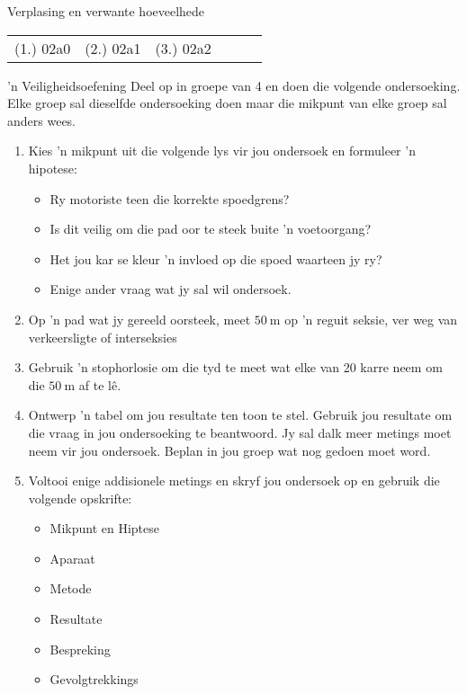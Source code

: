 \begin{exercises}{Verplasing en verwante hoeveelhede}
\practiceinfo
 \par \begin{tabular}[h]{cccccc}
 (1.) 02a0  &  (2.) 02a1  &  (3.) 02a2  & \end{tabular}
\end{exercises} \pagebreak


\begin{Investigation}{ 'n Veiligheidsoefening}
            \nopagebreak
Deel op in groepe van 4 en doen die volgende ondersoeking. Elke groep sal dieselfde ondersoeking doen maar die mikpunt van elke groep sal anders wees.\par

\begin{enumerate}[noitemsep, label=\textbf{\arabic*}. ] 
    \item Kies 'n mikpunt uit die volgende lys vir jou ondersoek en formuleer 'n hipotese:
    \begin{itemize}[noitemsep]
        \item Ry motoriste teen die korrekte spoedgrens?
        \item Is dit veilig om die pad oor te steek buite 'n voetoorgang?
        \item Het jou kar se kleur 'n invloed op die spoed waarteen jy ry?
        \item Enige ander vraag wat jy sal wil ondersoek.
\end{itemize}

\item Op 'n pad wat jy gereeld oorsteek, meet $50~\text{m}$ op 'n reguit seksie, ver weg van verkeers\-ligte of interseksies
\item Gebruik 'n stophorlosie om die tyd te meet wat elke van 20 karre neem om die $50~\text{m}$ af te l\^e.
\item Ontwerp 'n tabel om jou resultate ten toon te stel. Gebruik jou resultate om die vraag in jou ondersoeking te beantwoord. Jy sal dalk meer metings moet neem vir jou ondersoek. Beplan in jou groep wat nog gedoen moet word.
\item Voltooi enige addisionele metings en skryf jou ondersoek op en gebruik die volgende opskrifte:
\begin{itemize}[noitemsep]
    \item Mikpunt en Hiptese
    \item Aparaat
    \item Metode
    \item Resultate
    \item Bespreking
    \item Gevolgtrekkings
\end{itemize}


\end{enumerate}
\end{Investigation}
